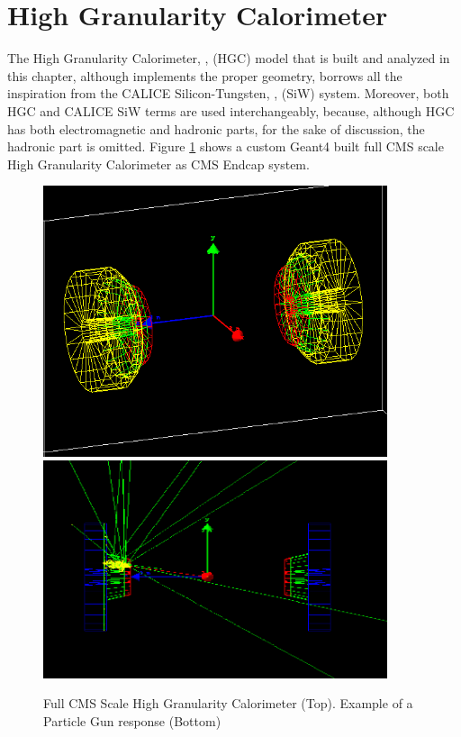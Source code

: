 \section{High Granularity Calorimeter} \label{section:simulations_hgc}
The High Granularity Calorimeter, \cite{Magnan:2017exp}, (HGC) model that is built and analyzed in this chapter, although implements the proper geometry, borrows all the inspiration from the CALICE Silicon-Tungsten, \cite{Adloff:2008aa}, (SiW) system. Moreover, both {\sc HGC} and {\sc CALICE} SiW terms are used interchangeably, because, although {\sc HGC} has both electromagnetic and hadronic parts, for the sake of discussion, the hadronic part is omitted. Figure \ref{fig:simulations_hgcexamples} shows a custom {\sc Geant4} built full CMS scale High Granularity Calorimeter as CMS Endcap system.
\begin{figure}[htbp]
    \centering
    \includegraphics[width=0.9\textwidth]{figures/ch_simulations/hgc/detetor_3d/HGC_70_20.png}
    \includegraphics[width=0.9\textwidth]{figures/ch_simulations/hgc/detetor_3d/HGCal_1Event_NoSides.png}
    \caption{Full CMS Scale High Granularity Calorimeter (Top). Example of a Particle Gun response (Bottom)}
    \label{fig:simulations_hgcexamples}
 \end{figure}

